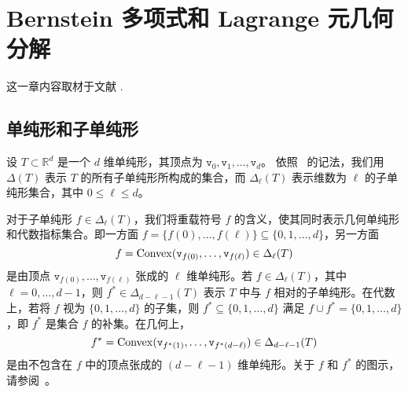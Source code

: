 \chapter{Bernstein 多项式和 Lagrange 元几何分解}

这一章内容取材于文献 \cite{ChenHuang2024a,ChenChenHuangWei2024}. 

\section{单纯形和子单纯形}
设 $T \subset \mathbb{R}^{d}$ 是一个 $d$ 维单纯形，其顶点为 $\texttt{v}_{0}, \texttt{v}_{1}, \ldots, \texttt{v}_{d}$。
依照~\cite{ArnoldFalkWinther2009} 的记法，我们用 $\Delta(T)$ 表示 $T$ 的所有子单纯形所构成的集合，而 $\Delta_{\ell}(T)$ 表示维数为 $\ell$ 的子单纯形集合，其中 $0\leq \ell \leq d$。

对于子单纯形 $f\in \Delta_{\ell}(T)$，我们将重载符号 $f$ 的含义，使其同时表示几何单纯形和代数指标集合。即一方面 $f = \{f(0), \ldots, f(\ell)\}\subseteq \{0, 1, \ldots, d\}$，另一方面
\[
f ={\rm Convex}(\texttt{v}_{f(0)}, \ldots, \texttt{v}_{f(\ell)}) \in \Delta_{\ell}(T)
\]
是由顶点 $\texttt{v}_{f(0)}, \ldots, \texttt{v}_{f( \ell)}$ 张成的 $\ell$ 维单纯形。若 $f \in \Delta_{\ell}(T)$，其中 $\ell = 0, \ldots, d-1$，则 $f^{*} \in \Delta_{d- \ell-1}(T)$ 表示 $T$ 中与 $f$ 相对的子单纯形。在代数上，若将 $f$ 视为 $\{0, 1, \ldots, d\}$ 的子集，则 $f^*\subseteq \{0,1, \ldots, d\}$ 满足 $f\cup f^* = \{0, 1, \ldots, d\}$，即 $f^*$ 是集合 $f$ 的补集。在几何上，
\[
f^* ={\rm Convex}(\texttt{v}_{f^*(1)}, \ldots, \texttt{v}_{f^*(d-\ell)}) \in \Delta_{d- \ell-1}(T)
\]
是由不包含在 $f$ 中的顶点张成的 $(d- \ell-1)$ 维单纯形。关于 $f$ 和 $f^*$ 的图示，请参阅~\cite[Fig. 2]{ChenHuang2024}。

